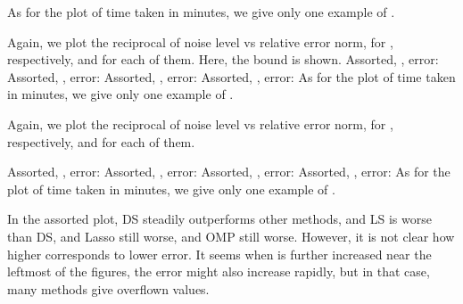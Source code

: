 As for the plot of time taken in minutes, we give only one example of .
%
\blank [big]

\stopsubsection

\startsubsection [title={Plots of DS only}]

Again, we plot the reciprocal of noise level vs relative error norm, for , respectively, and  for each of them.
Here, the bound \m {\T {\chi}} is shown.
%
Assorted, , error:
\blank [big]
%
Assorted, , error:
\blank [big]
%
Assorted, , error:
\blank [big]
%
Assorted, , error:
\blank [big]
%
As for the plot of time taken in minutes, we give only one example of .
%
\blank [big]

\stopsubsection

\startsubsection [title={Plots of OMP only}]

Again, we plot the reciprocal of noise level vs relative error norm, for , respectively, and  for each of them.

%
Assorted, , error:
\blank [big]
%
Assorted, , error:
\blank [big]
%
Assorted, , error:
\blank [big]
%
Assorted, , error:
\blank [big]
%
As for the plot of time taken in minutes, we give only one example of .
%
\blank [big]

\stopsubsection

\startsubsection [title={Discussion}]

In the assorted plot, DS steadily outperforms other methods, and LS is worse than DS, and Lasso still worse, and OMP still worse.
However, it is not clear how higher \m {\s} corresponds to lower error.
It seems when \m {\s} is further increased near the leftmost of the figures, the error might also increase rapidly, but in that case, many methods give overflown values.

